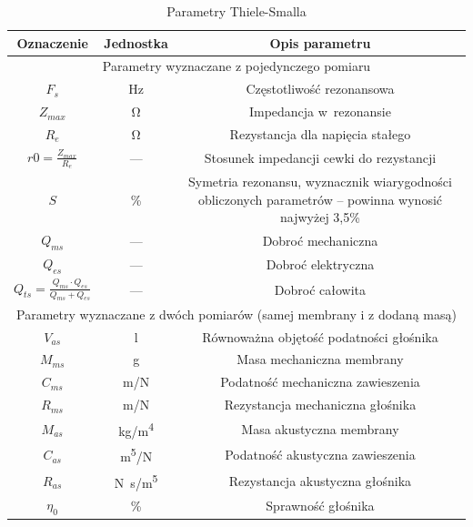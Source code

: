 \documentclass[12pt]{oska}
\begin{document}
			\begin{table}[h!]
				\centering
				\caption{Parametry Thiele-Smalla}
				\label{t:TS_opis}
				\begin{tabular}{|c|c|c|}
				\hline
					\textbf{Oznaczenie} & \textbf{Jednostka} & \textbf{Opis parametru}\\\hline\hline
					\multicolumn{3}{|c|}{Parametry wyznaczane z pojedynczego pomiaru} \\\hline\hline
					$F_s$ & Hz & Częstotliwość rezonansowa \\\hline
					$Z_{max}$ & \si{\ohm} & Impedancja w~rezonansie \\\hline
					$R_e$ & \si{\ohm} & Rezystancja dla napięcia stałego \\\hline
					$r0=\frac{Z_{max}}{R_e}$ & --- & Stosunek impedancji cewki do rezystancji \\\hline
					$S$ & \% & \makecell{Symetria rezonansu, wyznacznik wiarygodności\\obliczonych parametrów -- powinna wynosić najwyżej 3,5\%} \\\hline
					\hline
					$Q_{ms}$ & --- & Dobroć mechaniczna \\\hline
					$Q_{es}$ & --- & Dobroć elektryczna \\\hline
					$Q_{ts}=\frac{Q_{ms}\cdot Q_{es}}{Q_{ms}+Q_{es}}$ & --- & Dobroć całowita \\\hline
					\hline
					\multicolumn{3}{|c|}{Parametry wyznaczane z dwóch pomiarów (samej membrany i z dodaną masą)} \\\hline\hline
					$V_{as}$ & \si{\litre} & Równoważna objętość podatności głośnika \\\hline
					$M_{ms}$ & \si{\gram} & Masa mechaniczna membrany \\\hline
					$C_{ms}$ & \si[per-mode=symbol]{\metre\per\newton} & Podatność mechaniczna zawieszenia \\\hline
					$R_{ms}$ & \si[per-mode=symbol]{\metre\per\newton} & Rezystancja mechaniczna głośnika \\\hline
					\hline
					$M_{as}$ & \si[per-mode=symbol]{\kilo\gram\per\metre\tothe{4}} & Masa akustyczna membrany \\\hline
					$C_{as}$ & \si[per-mode=symbol]{\metre\tothe{5}\per\newton} & Podatność akustyczna zawieszenia \\\hline
					$R_{as}$ & \si[per-mode=symbol]{\newton\s\per\metre\tothe{5}} & Rezystancja akustyczna głośnika \\\hline
					\hline
					$\eta_0$ & \% & Sprawność głośnika \\\hline
				\end{tabular}

			\end{table}
\end{document}
